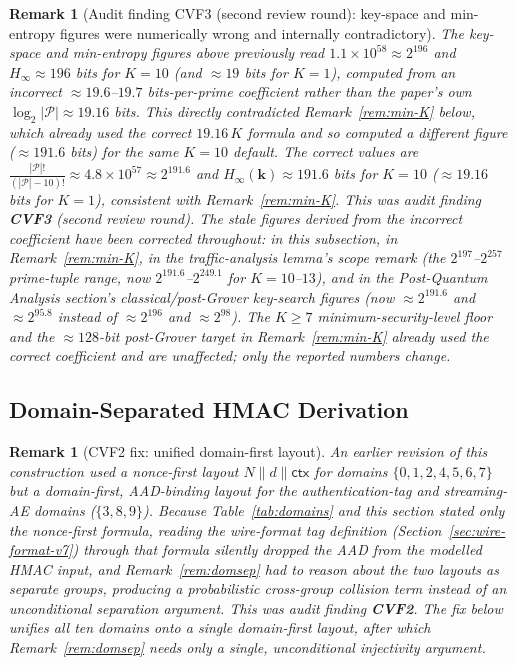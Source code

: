 \documentclass[11pt,a4paper]{article}
\newtheorem{remark}[theorem]{Remark}
\begin{document}
\begin{remark}[Audit finding CVF3 (second review round): key-space and min-entropy figures were numerically wrong and internally contradictory]
\label{rem:v2cvf3}
The key-space and min-entropy figures above previously read
$1.1\times10^{58}\approx2^{196}$ and $H_\infty\approx196$ bits for $K=10$
(and $\approx19$ bits for $K=1$), computed from an incorrect
$\approx19.6$--$19.7$ bits-per-prime coefficient rather than the paper's
own $\log_2|\mathcal{P}|\approx19.16$ bits. This directly contradicted
Remark~\ref{rem:min-K} below, which already used the correct $19.16\,K$
formula and so computed a different figure ($\approx191.6$ bits) for the
same $K=10$ default. The correct values are
$\frac{|\mathcal{P}|!}{(|\mathcal{P}|-10)!}\approx4.8\times10^{57}\approx2^{191.6}$
and $H_\infty(\mathbf{k})\approx191.6$ bits for $K=10$ ($\approx19.16$ bits
for $K=1$), consistent with Remark~\ref{rem:min-K}. This was audit finding
\textbf{CVF3} (second review round). The stale figures derived from the
incorrect coefficient have been corrected throughout: in this subsection,
in Remark~\ref{rem:min-K}, in the traffic-analysis lemma's scope remark
(the $2^{197}$--$2^{257}$ prime-tuple range, now $2^{191.6}$--$2^{249.1}$
for $K=10$--$13$), and in the Post-Quantum Analysis section's
classical/post-Grover key-search figures (now $\approx2^{191.6}$ and
$\approx2^{95.8}$ instead of $\approx2^{196}$ and $\approx2^{98}$). The
$K\geq7$ minimum-security-level floor and the $\approx128$-bit post-Grover
target in Remark~\ref{rem:min-K} already used the correct coefficient and
are unaffected; only the reported numbers change.
\end{remark}

\subsection{Domain-Separated HMAC Derivation}

\begin{remark}[CVF2 fix: unified domain-first layout]
An earlier revision of this construction used a \emph{nonce-first} layout
$N \| d \| \mathsf{ctx}$ for domains $\{0,1,2,4,5,6,7\}$ but a
\emph{domain-first}, AAD-binding layout for the authentication-tag and
streaming-AE domains ($\{3,8,9\}$). Because Table~\ref{tab:domains} and this
section stated only the nonce-first formula, reading the wire-format tag
definition (Section~\ref{sec:wire-format-v7}) through that formula silently
dropped the AAD from the modelled HMAC input, and Remark~\ref{rem:domsep}
had to reason about the two layouts as separate groups, producing a
probabilistic cross-group collision term instead of an unconditional
separation argument. This was audit finding \textbf{CVF2}. The fix below
unifies all ten domains onto a single domain-first layout, after which
Remark~\ref{rem:domsep} needs only a single, unconditional injectivity
argument.
\end{remark}
\end{document}
